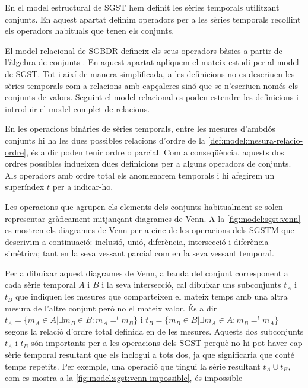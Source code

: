 En el model estructural de \gls{SGST} hem definit les sèries temporals
utilitzant conjunts. En aquest apartat definim operadors per a les
sèries temporals recollint els operadors habituals que tenen els
conjunts.   

El model relacional de \gls{SGBDR} defineix els seus operadors bàsics
a partir de l'àlgebra de
conjunts \parencite[cap.~7]{date04:introduction8}. En aquest apartat
apliquem el mateix estudi per al model de \gls{SGST}. Tot i així de
manera simplificada, a les definicions no es descriuen les sèries
temporals com a relacions amb capçaleres sinó que se n'escriuen només
els conjunts de valors. Seguint el model relacional es poden estendre
les definicions i introduir el model complet de relacions.



En les operacions binàries de sèries temporals, entre les mesures
d'ambdós conjunts hi ha les dues possibles relacions d'ordre de la
\autoref{def:model:mesura-relacio-ordre}, és a dir poden tenir ordre o
parcial. Com a conseqüència, aquests dos ordres possibles indueixen
dues definicions per a alguns operadors de conjunts. Als operadors amb
ordre total els anomenarem temporals i hi afegirem un superíndex $t$
per a indicar-ho.


Les operacions que agrupen els elements dels conjunts habitualment se
solen representar gràficament mitjançant diagrames de Venn. A la
\autoref{fig:model:sgst:venn} es mostren els diagrames de Venn per a
cinc de les operacions dels \gls{SGSTM} que descrivim a continuació:
inclusió, unió, diferència, intersecció i diferència simètrica; tant
en la seva vessant parcial com en la seva vessant temporal.  

Per a dibuixar aquest diagrames de Venn, a banda del conjunt
corresponent a cada sèrie temporal $A$ i $B$ i la seva intersecció,
cal dibuixar uns subconjunts $t_A$ i $t_B$ que indiquen les mesures
que comparteixen el mateix temps amb una altra mesura de l'altre
conjunt però no el mateix valor. És a dir $t_A = \{ m_A \in A |
\exists m_B \in B: m_A =^t m_B \}$ i $t_B = \{ m_B \in B | \exists m_A
\in A: m_B =^t m_A \}$ segons la relació d'ordre total definida en de
les mesures.  Aquests dos subconjunts $t_A$ i $t_B$ són importants per
a les operacions dels \gls{SGST} perquè no hi pot haver cap sèrie
temporal resultant que els inclogui a tots dos, ja que significaria
que conté temps repetits. Per exemple, una operació que tingui la
sèrie resultant $t_A \cup t_B$, com es mostra a la
\autoref{fig:model:sgst:venn-impossible}, és impossible


